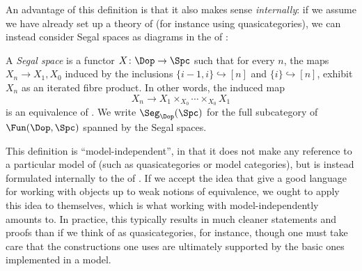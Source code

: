 \documentclass[a4paper,12pt]{article}
\begin{document}
An advantage of this definition is that it also makes sense
\emph{internally}: if we assume we have already set up a theory of
\icats{} (for instance using quasicategories), we can instead consider
Segal spaces as diagrams in the \icat{} of \igpds{}:
\begin{defn}
  A \emph{Segal space} is a functor $X \colon \Dop \to \Spc$ such
  that for every $n$, the maps $X_{n} \to X_{1}, X_{0}$ induced by the
  inclusions $\{i-1,i\} \hookrightarrow [n]$ and
  $\{i\} \hookrightarrow [n]$, exhibit $X_{n}$ as an iterated
  fibre
  product.  In other words, the induced map
  \[ X_{n} \to X_{1} \times_{X_{0}} \cdots \times_{X_{0}}
    X_{1}\] is an equivalence of \igpds{}. We write $\Seg_{\Dop}(\Spc)$ for
  the full subcategory of $\Fun(\Dop, \Spc)$ spanned by the Segal spaces.
\end{defn}
\begin{remark}
  This definition is ``model-independent'', in that it does not make
  any reference to a particular model of \icats{} (such as
  quasicategories or model categories), but is instead formulated
  internally to the \icat{} of \icats{}. If we accept the idea that
  \icats{} give a good language for working with objects up to weak
  notions of equivalence, we ought to apply this idea to \icats{}
  themselves, which is what working with \icats{} model-independently
  amounts to. In practice, this typically results in much cleaner
  statements and proofs than if we think of \icats{} as
  quasicategories, for instance, though one must take care that the
  constructions one uses are ultimately supported by the basic ones
  implemented in a model.
\end{remark}
\end{document}
